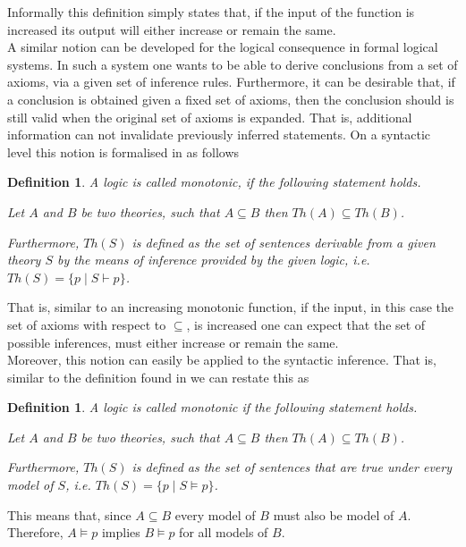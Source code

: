 \documentclass{article}
\newtheorem{mydef}[thm]{Definition}
\begin{document}
Informally this definition simply states that, if the input of the function is increased its output will either increase or remain the same. \\
A similar notion can be developed for the logical consequence in formal logical systems.
In such a system one wants to be able to derive conclusions from a set of axioms, via a given set of inference rules. Furthermore, it can be desirable that,
if a conclusion is obtained given a fixed set of axioms, then the conclusion should is still valid when the original set of axioms is expanded. That is, additional information can not invalidate previously inferred statements\cite{mcdermott1980non, BOCHMAN2007557}.
On a syntactic level this notion is formalised in \cite{mcdermott1980non} as follows

\begin{mydef}
    A logic is called monotonic, if the following statement holds.
    \begin{center}
        Let $A$ and $B$ be two theories, such that $A \subseteq B$
        then $Th(A) \subseteq Th(B)$.
    \end{center}
    Furthermore, $Th(S)$ is defined as the set of sentences
    derivable from a given theory $S$ by the means of inference provided by the given logic, i.e.
    $Th(S)=\{p \mid S \vdash p \}$.
\end{mydef}


That is, similar to an increasing monotonic function, if the input, in this case the set of axioms with respect to $\subseteq$, is increased one can expect that the set of possible inferences, must either increase or remain the same. \\

Moreover, this notion can easily be applied to the syntactic inference. That is, similar to the definition found in \cite{mccarthy1981circumscription} we can restate this as 

\begin{mydef}
    A logic is called monotonic if the following statement holds.
    \begin{center}
        Let $A$ and $B$ be two theories, such that $A \subseteq B$
        then $Th(A) \subseteq Th(B)$.
    \end{center}
    Furthermore, $Th(S)$ is defined as the set of sentences
    that are true under every model of $S$, i.e. $Th(S)=\{p \mid S \models p \}$.
\end{mydef}

This means that, since $A \subseteq B$ every model of $B$ must also be  model of $A$. Therefore, $A \models p$ implies $B \models p$ for all models of $B$.\\
\linebreak
\end{document}
